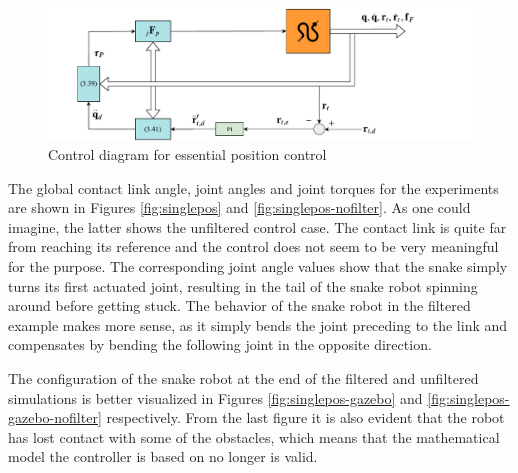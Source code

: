 \begin{figure}
    \centering
    \includegraphics[trim=1cm 0cm 3cm 0cm, clip=true, width=\textwidth]{figures/experiments/control-diagrams/p-control-diagram.pdf}
    \caption{Control diagram for essential position control}
    \label{fig:diag-p}
\end{figure}

The global contact link angle, joint angles and joint torques for the experiments are shown in Figures \ref{fig:singlepos} and \ref{fig:singlepos-nofilter}. As one could imagine, the latter shows the unfiltered control case. The contact link is quite far from reaching its reference and the control does not seem to be very meaningful for the purpose. The corresponding joint angle values show that the snake simply turns its first actuated joint, resulting in the tail of the snake robot spinning around before getting stuck. The behavior of the snake robot in the filtered example makes more sense, as it simply bends the joint preceding to the link and compensates by bending the following joint in the opposite direction.

The configuration of the snake robot at the end of the filtered and unfiltered simulations is better visualized in Figures \ref{fig:singlepos-gazebo} and \ref{fig:singlepos-gazebo-nofilter} respectively. From the last figure it is also evident that the robot has lost contact with some of the obstacles, which means that the mathematical model the controller is based on no longer is valid.

